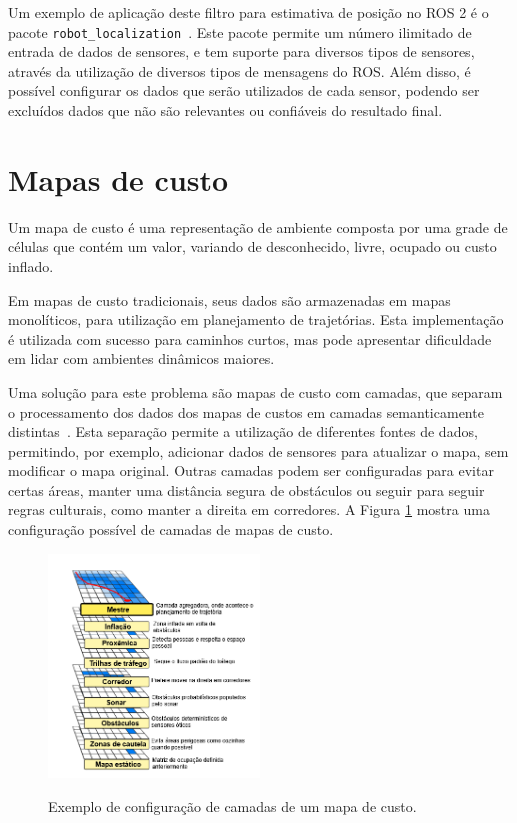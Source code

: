 \documentclass[repeatfields,xlists,xpacks,oneside,yearsonly]{ufrgscca}
\begin{document}
Um exemplo de aplicação deste filtro para estimativa de posição no
ROS 2 é o pacote
\texttt{robot\_localization}~\cite{robot_localization_paper}. Este
pacote permite um número ilimitado de entrada de dados de sensores, e
tem suporte para diversos tipos de sensores, através da utilização de
diversos tipos de mensagens do ROS. Além disso, é possível configurar
os dados que serão utilizados de cada sensor, podendo ser excluídos
dados que não são relevantes ou confiáveis do resultado final.

\section{Mapas de custo}

Um mapa de custo é uma representação de ambiente composta por uma
grade de células que contém um valor, variando de desconhecido,
livre, ocupado ou custo inflado.

Em mapas de custo tradicionais, seus dados são armazenadas em mapas
monolíticos, para utilização em planejamento de trajetórias. Esta
implementação é utilizada com sucesso para caminhos curtos, mas pode
apresentar dificuldade em lidar com ambientes dinâmicos maiores.

Uma solução para este problema são mapas de custo com camadas, que
separam o processamento dos dados dos mapas de custos em camadas
semanticamente distintas~\cite{layered_costmaps}. Esta separação
permite a utilização de diferentes fontes de dados, permitindo, por
exemplo, adicionar dados de sensores para atualizar o mapa, sem
modificar o mapa original. Outras camadas podem ser configuradas para
evitar certas áreas, manter uma distância segura de obstáculos ou
seguir para seguir regras culturais, como manter a direita em
corredores. A Figura \ref{fig:mapa_camadas} mostra uma configuração
possível de camadas de mapas de custo.

\begin{figure}[h]
    {
        \centering
        \caption{Exemplo de configuração de camadas de um mapa de custo.}
        \label{fig:mapa_camadas}
        \includegraphics[width=0.5\textwidth]{mapa_camadas_trad.png}\\
    }
    {}
\end{figure}
\end{document}
